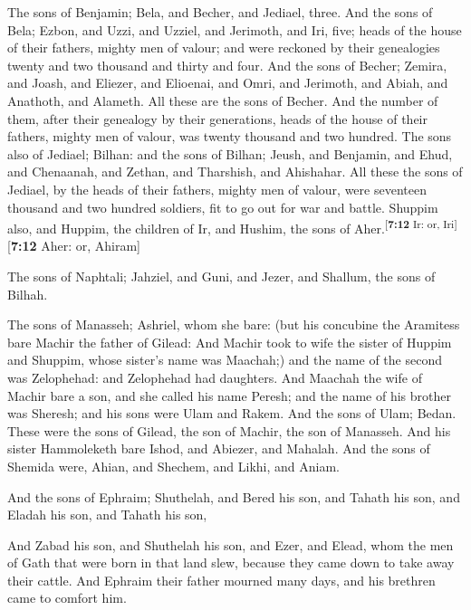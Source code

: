  The sons of Benjamin; Bela, and Becher, and Jediael,
three.  And the sons of Bela; Ezbon, and Uzzi, and Uzziel,
and Jerimoth, and Iri, five; heads of the house of their fathers, mighty
men of valour; and were reckoned by their genealogies twenty and two
thousand and thirty and four.  And the sons of Becher;
Zemira, and Joash, and Eliezer, and Elioenai, and Omri, and Jerimoth,
and Abiah, and Anathoth, and Alameth. All these are the sons of Becher.
 And the number of them, after their genealogy by their
generations, heads of the house of their fathers, mighty men of valour,
was twenty thousand and two hundred.  The sons also of
Jediael; Bilhan: and the sons of Bilhan; Jeush, and Benjamin, and Ehud,
and Chenaanah, and Zethan, and Tharshish, and Ahishahar. 
All these the sons of Jediael, by the heads of their fathers, mighty men
of valour, were seventeen thousand and two hundred soldiers, fit to go
out for war and battle.  Shuppim also, and Huppim, the
children of Ir, and Hushim, the sons of
Aher.\textsuperscript{{[}\textbf{7:12} Ir: or, Iri{]}}{[}\textbf{7:12}
Aher: or, Ahiram{]}

 The sons of Naphtali; Jahziel, and Guni, and Jezer, and
Shallum, the sons of Bilhah.

 The sons of Manasseh; Ashriel, whom she bare: (but his
concubine the Aramitess bare Machir the father of Gilead:
 And Machir took to wife the sister of Huppim and
Shuppim, whose sister's name was Maachah;) and the name of the second
was Zelophehad: and Zelophehad had daughters.  And
Maachah the wife of Machir bare a son, and she called his name Peresh;
and the name of his brother was Sheresh; and his sons were Ulam and
Rakem.  And the sons of Ulam; Bedan. These were the sons
of Gilead, the son of Machir, the son of Manasseh.  And
his sister Hammoleketh bare Ishod, and Abiezer, and Mahalah.
 And the sons of Shemida were, Ahian, and Shechem, and
Likhi, and Aniam.

 And the sons of Ephraim; Shuthelah, and Bered his son,
and Tahath his son, and Eladah his son, and Tahath his son,

 And Zabad his son, and Shuthelah his son, and Ezer, and
Elead, whom the men of Gath that were born in that land slew, because
they came down to take away their cattle.  And Ephraim
their father mourned many days, and his brethren came to comfort him.

